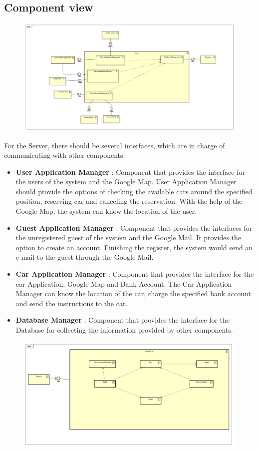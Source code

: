 \documentclass{article}
\begin{document}
	\subsection{Component view}
	\begin{figure}[h]
	\includegraphics[width=\textwidth]{CV_Server}
	\end{figure}
	For the Server, there should be several interfaces, which are in charge of communicating with other components: 
	\begin{itemize}
		\item \textbf{User Application Manager} : Component that provides the interface for the users of the system and the Google Map. User Application Manager should provide the options of checking the available cars around the specified position, reserving car and canceling the reservation. With the help of the Google Map, the system can know the location of the user.
		\item \textbf{Guest Application Manager} : Component that provides the interfaces for the unregistered guest of the system and the Google Mail. It provides the option to create an account. Finishing the register, the system would send an e-mail to the guest through the Google Mail.
		\item \textbf{Car Application Manager} : Component that provides the interface for the car Application, Google Map and Bank Account. The Car Application Manager can know the location of the car, charge the specified bank account and send the instructions to the car.
		\item \textbf{Database Manager} : Component that provides the interface for the Database for collecting the information provided by other components.   
	\end{itemize}
	\newpage
	\begin{figure}[h]
	\includegraphics[width=\textwidth]{CV_Database}
	\end{figure}
\end{document}
